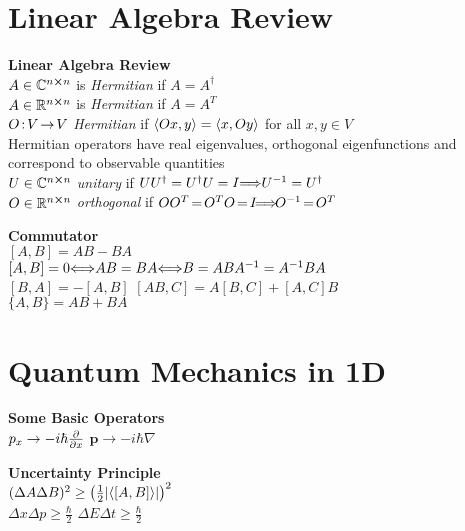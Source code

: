 \documentclass[11pt, a4paper]{article}
\newcommand{\newsec}[1]{\vspace{2mm}\textbf{#1}\\}
\newcommand{\C}{\mathbb{C}} %
\newcommand{\R}{\mathbb{R}} %
\renewcommand{\vec}[1]{\bm{#1}} %
\let\spaceyiff\iff
\renewcommand{\iff}{\hspace{-1mm}\spaceyiff\hspace{-1mm}}
\let\spaceyimplies\implies
\renewcommand{\implies}{\hspace{-1mm}\spaceyimplies\hspace{-1mm}}
\begin{document}
\begin{multicols}{2}

\section{Linear Algebra Review}
\newsec{Linear Algebra Review}
$ A \in \C^{n \cross n} $ is \textit{Hermitian} if $ A = A^{\dagger} $\\
$ A \in \R^{n \cross n} $ is \textit{Hermitian} if $ A = A^{T} $\\
$ O\hspace{-0.5mm}:\hspace{-0.5mm} V \hspace{-0.5mm}\to\hspace{-0.5mm} V$ \textit{Hermitian} if $ \expval{Ox, y} = \expval{x, Oy} $ for all $ x, y \in V $\\
Hermitian operators have real eigenvalues, orthogonal eigenfunctions and correspond to observable quantities\\
$ U \in \C^{n \cross n} $ \textit{unitary} if $ UU^{\dagger} = U^{\dagger}U = I \implies U^{-1} = U^{\dagger} $\\
$ O \in \R^{n \cross n} $ \textit{orthogonal} if $ OO^{T} \hspace{-0.5mm}=\hspace{-0.5mm} O^{T}O \hspace{-0.5mm}=\hspace{-0.5mm} I \hspace{-0.5mm}\implies \hspace{-0.5mm} O^{-1} \hspace{-0.5mm}=\hspace{-0.5mm} O^{T} $


\newsec{Commutator}
$ [A, B] = AB - BA $\\
$ [A, B] = 0  \iff   AB = BA  \iff  B = ABA^{-1} = A^{-1}BA$ \\
$ [B, A] = -[A, B] $ \qquad $ [AB, C] = A[B, C] + [A, C]B $\\
$ \{A, B\} = AB + BA $

\section{Quantum Mechanics in 1D}

\newsec{Some Basic Operators}
$ p_{x} \to - i\hbar \pdv{x} $ \quad $ \vec{p} \to - i \hbar \nabla $


\newsec{Uncertainty Principle}
$ (\Delta A \Delta B)^{2} \geq \left(\frac{1}{2}\abs{\ev{[A, B]}}\right)^{2} $\\
$ \Delta x \Delta p \geq \frac{\hbar}{2} $ \quad $ \Delta E \Delta t \geq \frac{\hbar}{2} $


\end{multicols}
\end{document}

